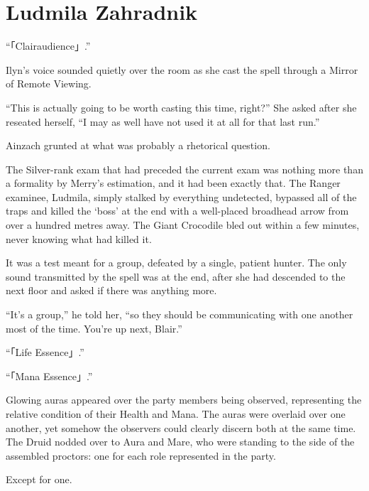 \chapter{Ludmila Zahradnik}

“「Clairaudience」.”

 

Ilyn’s voice sounded quietly over the room as she cast the spell through a Mirror of Remote Viewing.

 

“This is actually going to be worth casting this time, right?” She asked after she reseated herself, “I may as well have not used it at all for that last run.”

 

Ainzach grunted at what was probably a rhetorical question.

 

The Silver-rank exam that had preceded the current exam was nothing more than a formality by Merry’s estimation, and it had been exactly that. The Ranger examinee, Ludmila, simply stalked by everything undetected, bypassed all of the traps and killed the ‘boss’ at the end with a well-placed broadhead arrow from over a hundred metres away. The Giant Crocodile bled out within a few minutes, never knowing what had killed it.

 

It was a test meant for a group, defeated by a single, patient hunter. The only sound transmitted by the spell was at the end, after she had descended to the next floor and asked if there was anything more.

 

“It’s a group,” he told her, “so they should be communicating with one another most of the time. You’re up next, Blair.”

 

“「Life Essence」.”

 

“「Mana Essence」.”

 

Glowing auras appeared over the party members being observed, representing the relative condition of their Health and Mana. The auras were overlaid over one another, yet somehow the observers could clearly discern both at the same time. The Druid nodded over to Aura and Mare, who were standing to the side of the assembled proctors: one for each role represented in the party.

 

Except for one.

